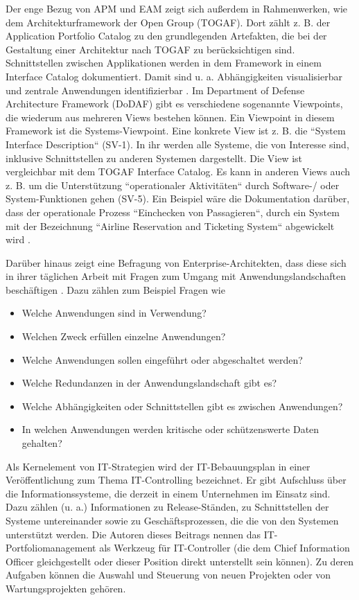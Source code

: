 Der enge Bezug von APM und EAM zeigt sich außerdem in Rahmenwerken, wie dem Architekturframework der Open Group (TOGAF). Dort zählt z. B. der Application Portfolio Catalog zu den grundlegenden Artefakten, die bei der Gestaltung einer Architektur nach TOGAF zu berücksichtigen sind. Schnittstellen zwischen Applikationen werden in dem Framework in einem Interface Catalog dokumentiert. Damit sind u. a. Abhängigkeiten visualisierbar und zentrale Anwendungen identifizierbar \cite[Kap. 31]{togaf}. Im Department of Defense Architecture Framework (DoDAF) gibt es verschiedene sogenannte Viewpoints, die wiederum aus mehreren Views bestehen können. Ein Viewpoint in diesem Framework ist die Systems-Viewpoint. Eine konkrete View ist z. B. die ``System Interface Description`` (SV-1). In ihr werden alle Systeme, die von Interesse sind, inklusive Schnittstellen zu anderen Systemen dargestellt. Die View ist vergleichbar mit dem TOGAF Interface Catalog. Es kann in anderen Views auch z. B. um die Unterstützung ``operationaler Aktivitäten`` durch Software-/ oder System-Funktionen gehen (SV-5). Ein Beispiel wäre die Dokumentation darüber, dass der operationale Prozess ``Einchecken von Passagieren``, durch ein System mit der Bezeichnung ``Airline Reservation and Ticketing System`` abgewickelt wird \cite[S. 311-344]{Rao}.

Darüber hinaus zeigt eine Befragung von Enterprise-Architekten, dass diese sich in ihrer täglichen Arbeit mit Fragen zum Umgang mit Anwendungslandschaften beschäftigen \cite{jung2}. Dazu zählen zum Beispiel Fragen wie 

\begin{itemize}
  \item Welche Anwendungen sind in Verwendung? 
  \item Welchen Zweck erfüllen einzelne Anwendungen?
  \item Welche Anwendungen sollen eingeführt oder abgeschaltet werden?
  \item Welche Redundanzen in der Anwendungslandschaft gibt es?
  \item Welche Abhängigkeiten oder Schnittstellen gibt es zwischen Anwendungen?
  \item In welchen Anwendungen werden kritische oder schützenswerte Daten gehalten?
\end{itemize}

Als Kernelement von IT-Strategien wird der IT-Bebauungsplan in einer Veröffentlichung zum Thema IT-Controlling bezeichnet. Er gibt Aufschluss über die Informationssysteme, die derzeit in einem Unternehmen im Einsatz sind. Dazu zählen (u. a.) Informationen zu Release-Ständen, zu Schnittstellen der Systeme untereinander sowie zu Geschäftsprozessen, die die von den Systemen unterstützt werden. \cite[S. 36]{gadatsch} Die Autoren dieses Beitrags nennen das IT-Portfoliomanagement als Werkzeug für IT-Controller (die dem Chief Information Officer gleichgestellt oder dieser Position direkt unterstellt sein können). Zu deren Aufgaben können die Auswahl und Steuerung von neuen Projekten oder von Wartungsprojekten gehören. \cite[S. 41-45]{gadatsch}

